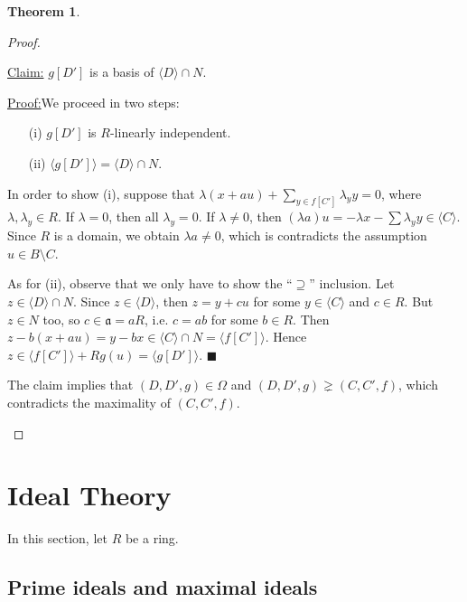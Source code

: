 \documentclass[12pt,a4paper]{report}
\theoremstyle{definition}
\newtheorem{theorem}{Theorem}[chapter] %
\theoremstyle{num.custom-title}
\newenvironment{claim}[1]{\par\noindent\underline{Claim#1:}\space}{} %
\newenvironment{claimproof}[1]{\par\noindent\underline{Proof:}\space#1}{\leavevmode\unskip\penalty9999 \hbox{}\nobreak\hfill\quad\hbox{$\blacksquare$}} %
\DeclareMathOperator{\sm}{\setminus}
\begin{document}
\begin{theorem}
\begin{proof}
\begin{enumerate}
\begin{claim}{}
$g[D']$ is a basis of $\langle D \rangle \cap N$.
\begin{claimproof}
We proceed in two steps:
\begin{enumerate}
\item[(i)] $g[D']$ is $R$-linearly independent.
\item[(ii)] $\langle g[D'] \rangle = \langle D \rangle \cap N$.
\end{enumerate}
In order to show (i), suppose that $\lambda(x+au) + \sum_{y \in f[C']} \lambda_y y =0$, where $\lambda,\lambda_y \in R$. If $\lambda = 0$, then all $\lambda_y = 0$. If $\lambda \neq 0$, then $(\lambda a) u = -\lambda x - \sum \lambda_y y \in \langle C \rangle$. Since $R$ is a domain, we obtain $\lambda a \neq 0$, which is contradicts the assumption $u \in B \sm C$.

As for (ii), observe that we only have to show the ``$\supseteq$'' inclusion. Let $z \in \langle D \rangle \cap N$. Since $z \in \langle D \rangle$, then $z = y+cu$ for some $y \in \langle C \rangle$ and $c \in R$. But $z \in N$ too, so $c \in \mathfrak{a} = aR$, i.e. $c=ab$ for some $b \in R$. Then $z-b(x+au) = y-bx \in \langle C \rangle \cap N = \langle f[C'] \rangle$. Hence $z \in \langle f[C'] \rangle + R g(u) = \langle g[D'] \rangle$.
\end{claimproof}
\end{claim}

The claim implies that $(D,D',g) \in \Omega$ and $(D,D',g) \gneq (C,C',f)$, which contradicts the maximality of $(C,C',f)$.
\end{enumerate}
\end{proof}
\end{theorem}






















\chapter{Ideal Theory}

In this section, let $R$ be a ring.

\section{Prime ideals and maximal ideals}
\end{document}
